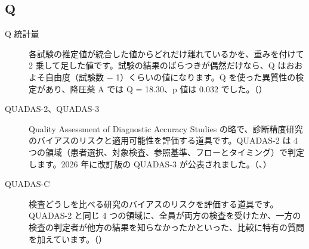 \subsection*{Q}
\begin{description}
\item[Q 統計量] 各試験の推定値が統合した値からどれだけ離れているかを、重みを付けて 2 乗して足した値です。試験の結果のばらつきが偶然だけなら、Q はおおよそ自由度（試験数 − 1）くらいの値になります。Q を使った異質性の検定があり、降圧薬 A では Q = 18.30、p 値は 0.032 でした。（）
\item[QUADAS-2、QUADAS-3] Quality Assessment of Diagnostic Accuracy Studies の略で、診断精度研究のバイアスのリスクと適用可能性を評価する道具です。QUADAS-2 は 4 つの領域（患者選択、対象検査、参照基準、フローとタイミング）で判定します。2026 年に改訂版の QUADAS-3 が公表されました。（、）
\item[QUADAS-C] 検査どうしを比べる研究のバイアスのリスクを評価する道具です。QUADAS-2 と同じ 4 つの領域に、全員が両方の検査を受けたか、一方の検査の判定者が他方の結果を知らなかったかといった、比較に特有の質問を加えています。（）
\end{description}

